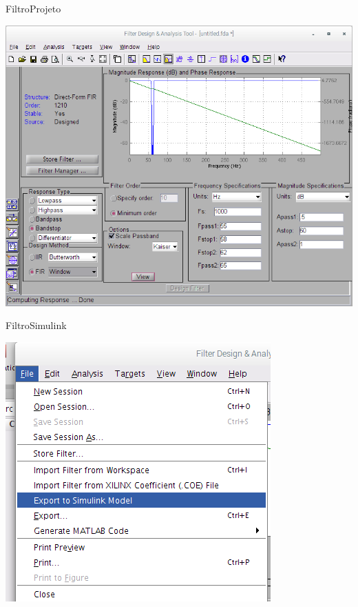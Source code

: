 \documentclass{beamer}
\begin{document}
\begin{frame}{Filtro}{Projeto}
\begin{center}
\includegraphics[width=1\linewidth]{matlab2}
\end{center}
\end{frame}

\begin{frame}{Filtro}{Simulink}
\begin{center}
\includegraphics[width=0.5\linewidth]{matlab3}
\end{center}
\end{frame}


\end{document}

